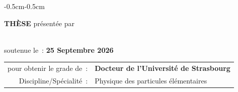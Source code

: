 \begin{changemargin}{-0.5cm}{-0.5cm}

\begin{center}
\huge \textbf{THÈSE} \large présentée par \quad
\bigskip

{\LARGE\bfseries\textsc{\authorFirstname \authorName}}\\
\bigskip
\large
{soutenue le~: \bfseries 25 Septembre 2026}


\bigskip
\bigskip
\bigskip
\bigskip
\bigskip


\begin{tabular}{rl}
 pour obtenir le grade de~:    & \textbf{Docteur de l'Université de Strasbourg} \\
 Discipline/Spécialité~:    &  Physique des particules élémentaires
\end{tabular}


\bigskip
\bigskip

\begin{mybox}
\Huge\centering
{\bfseries \thesisTitle}\\ \Large\centering
{\bfseries \thesisSubTitle}
\end{mybox}

\end{center}

\end{changemargin}

\bigskip
\bigskip
\bigskip
\bigskip

\normalsize

